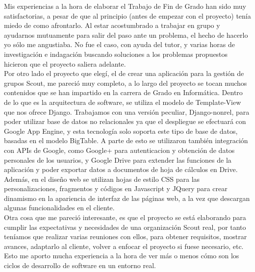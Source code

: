 



Mis experiencias a la hora de elaborar el Trabajo de Fin de Grado han sido muy satisfactorias, a pesar de que al principio 
(antes de empezar con el proyecto) tenía miedo de como afrontarlo. Al estar acostumbrado a trabajar en grupo y ayudarnos 
mutuamente para salir del paso ante un problema, el hecho de hacerlo yo sólo me angustiaba. No fue el caso, con ayuda del 
tutor, y varias horas de investigación e indagación buscando soluciones a los problemas propuestos hicieron que el proyecto saliera adelante.\\

Por otro lado el proyecto que elegí, el de crear una aplicación para la gestión de grupos Scout, me pareció muy completo, a lo 
largo del proyecto se tocan muchos contenidos que se han impartido en la carrera de Grado en Informática. Dentro de lo que es la 
arquitectura de software, se utiliza el modelo de Template-View que nos ofrece Django. Trabajamos con una versión peculiar,
Django-nonrel, para poder utilizar base de datos no relacionales ya que el despliegue se efectuará con Google App Engine, y esta tecnología 
solo soporta este tipo de base de datos, basadas en el modelo BigTable. A parte de esto se utilizaron también integración 
con APIs de Google, como Google+ para autenticacion y obtención de datos personales de los usuarios, y Google Drive para extender 
las funciones de la aplicación y poder exportar datos a documentos de hoja de cálculos en Drive. Además, en el diseño web se utilizan 
hojas de estilo CSS para las personalizaciones, fragmentos y códigos en Javascript y JQuery para crear dinamismo en la apariencia de interfaz de las páginas web, 
a la vez que descargan algunas funcionalidades en el cliente.\\

Otra cosa que me pareció interesante, es que el proyecto se está elaborando para cumplir las expectativas y necesidades de una organización 
Scout real, por tanto teníamos que realizar varias reuniones con ellos, para obtener requisitos, mostrar avances, adaptarlo al cliente, 
volver a enfocar el proyecto si fuese necesario, etc. Esto me aporto mucha experiencia a la hora de ver más o menos cómo son los ciclos de
desarrollo de software en un entorno real.\\


